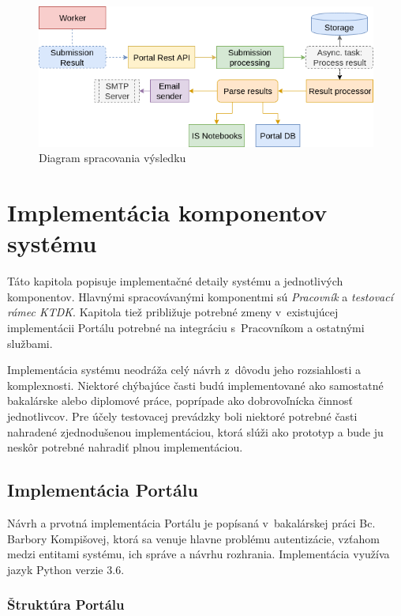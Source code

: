\documentclass[
  digital, %
  oneside, %
  table,   %
  lof,     %
  lot,   %
]{fithesis3}
\begin{document}
\begin{figure}[h]
  \begin{center}
    \includegraphics[width=\textwidth]{imgs/process-result.png}
  \end{center}
    \caption{Diagram spracovania výsledku}
    \label{fig:proc-result}
\end{figure}

\chapter{Implementácia komponentov systému}

Táto kapitola popisuje implementačné detaily systému a jednotlivých komponentov. Hlavnými spracovávanými komponentmi sú \emph{Pracovník} a \emph{testovací rámec KTDK}. Kapitola tiež približuje potrebné zmeny v~existujúcej implementácii Portálu potrebné na integráciu s~Pracovníkom a ostatnými službami.

Implementácia systému neodráža celý návrh z~dôvodu jeho rozsiahlosti a komplexnosti. Niektoré chýbajúce časti budú implementované ako samostatné bakalárske alebo diplomové práce, poprípade ako dobrovoľnícka činnosť jednotlivcov. Pre účely testovacej prevádzky boli niektoré potrebné časti nahradené zjednodušenou implementáciou, ktorá slúži ako prototyp a bude ju neskôr potrebné nahradiť plnou implementáciou.


\section{Implementácia Portálu}
\label{impl-portal}

Návrh a prvotná implementácia Portálu je popísaná v~bakalárskej práci Bc. Barbory Kompišovej, ktorá sa venuje hlavne problému autentizácie, vzťahom medzi entitami systému, ich správe a návrhu rozhrania\cite{kontr-portal}. Implementácia využíva jazyk Python verzie 3.6. 

\subsection{Štruktúra Portálu}
\end{document}
